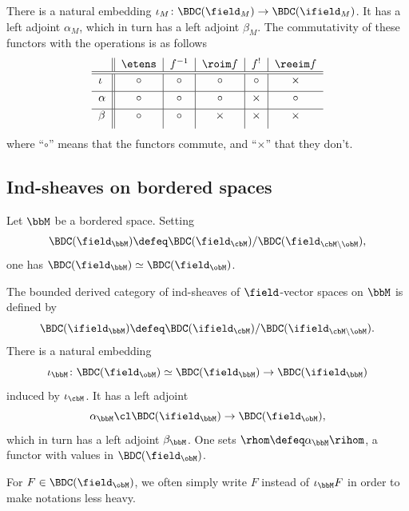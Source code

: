 There is a natural embedding $\iota_M\colon\BDC(\field_M)\to\BDC(\ifield_M)$. It has a left adjoint $\alpha_M$, which in turn has a left adjoint $\beta_M$.
The commutativity of these functors with the operations is as follows
\begin{equation}\label{eq:table}
\begin{tabular}{l||c|c|c|c|c}
{} & $\etens$ & $f^{-1}$ & $\roim f$ & $f^!$ & $\reeim f$ \\ \hline \hline
$\underset{}{\iota}$ & $\circ$ & $\circ$ & $\circ$ & $\circ$ & $\times$ \\ \hline
$\underset{}{\alpha}$ & $\circ$ & $\circ$ & $\circ$ & $\times$ & $\circ$ \\ \hline
$\underset{}{\beta}$ & $\circ$ & $\circ$ & $\times$ & $\times$ & $\times$
\end{tabular}
\end{equation}
where ``$\circ$'' means that the functors commute,
and ``$\times$'' that they don't.

\subsection{Ind-sheaves on bordered spaces}

Let $\bbM$ be a bordered space. Setting
\[
\BDC(\field_\bbM)\defeq \BDC(\field_\cbM)/\BDC(\field_{\cbM\setminus\obM}),
\]
one has $\BDC(\field_\bbM)\simeq\BDC(\field_\obM)$.

The bounded derived category of ind-sheaves of $\field$-vector spaces on $\bbM$ is defined by
\[
\BDC(\ifield_\bbM)\defeq \BDC(\ifield_\cbM)/\BDC(\ifield_{\cbM\setminus\obM}).
\]
There is a natural embedding \[\iota_\bbM\colon\BDC(\field_\obM)\simeq\BDC(\field_\bbM)\to\BDC(\ifield_\bbM)\] induced by $\iota_\cbM$. It has a left adjoint
\[\alpha_\bbM\cl \BDC(\ifield_\bbM)\to \BDC(\field_\obM),\]
which in turn has a left adjoint $\beta_\bbM$.
One sets
$\rhom\defeq\alpha_\bbM\rihom$, a functor with values in $\BDC(\field_\obM)$.

For $F\in \BDC(\field_\obM)$,
we often simply write $F$ instead of $\iota_\bbM F$
in order to make notations less heavy.

